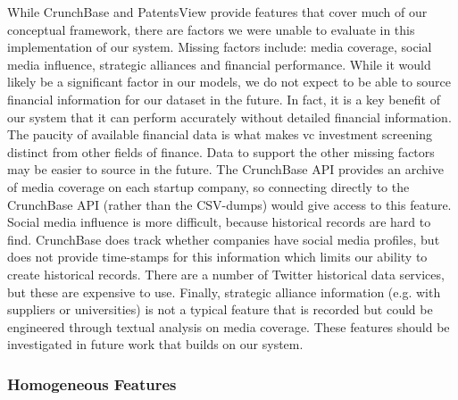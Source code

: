 \documentclass[../thesis/thesis.tex]{subfiles}
\begin{document}
While CrunchBase and PatentsView provide features that cover much of our conceptual framework, there are factors we were unable to evaluate in this implementation of our system. Missing factors include: media coverage, social media influence, strategic alliances and financial performance. While it would likely be a significant factor in our models, we do not expect to be able to source financial information for our dataset in the future. In fact, it is a key benefit of our system that it can perform accurately without detailed financial information. The paucity of available financial data is what makes \gls{vc} investment screening distinct from other fields of finance. Data to support the other missing factors may be easier to source in the future. The CrunchBase API provides an archive of media coverage on each startup company, so connecting directly to the CrunchBase API (rather than the CSV-dumps) would give access to this feature. Social media influence is more difficult, because historical records are hard to find. CrunchBase does track whether companies have social media profiles, but does not provide time-stamps for this information which limits our ability to create historical records. There are a number of Twitter historical data services, but these are expensive to use. Finally, strategic alliance information (e.g. with suppliers or universities) is not a typical feature that is recorded but could be engineered through textual analysis on media coverage. These features should be investigated in future work that builds on our system.

\subsubsection{Homogeneous Features}
\end{document}
